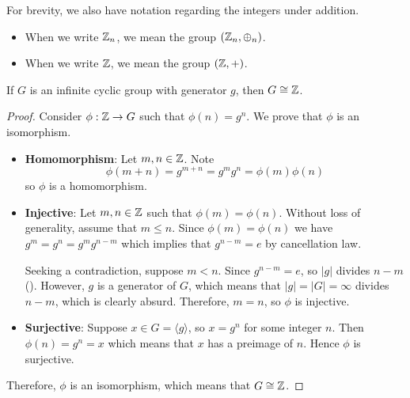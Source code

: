For brevity, we also have notation regarding the integers under addition.
\begin{itemize}
    \item When we write $\mathbb{Z}_n$, we mean the group $(\mathbb{Z}_n, \oplus_n)$.
    \item When we write $\mathbb{Z}$, we mean the group $(\mathbb{Z}, +)$.
\end{itemize}

\begin{theorem}
    If $G$ is an infinite cyclic group with generator $g$, then $G \cong \mathbb{Z}$.
\end{theorem}
\begin{proof}
    Consider $\phi: \mathbb{Z} \to G$ such that $\phi(n) = g^n$. We prove that $\phi$ is an isomorphism.
    \begin{itemize}
        \item \textbf{Homomorphism}: Let $m, n \in \mathbb{Z}$. Note
        \[
            \phi(m+n) = g^{m+n} = g^mg^n = \phi(m)\phi(n)
        \]
        so $\phi$ is a homomorphism.

        \item \textbf{Injective}: Let $m, n \in \mathbb{Z}$ such that $\phi(m) = \phi(n)$. Without loss of generality, assume that $m \leq n$. Since $\phi(m) = \phi(n)$ we have $g^m = g^n = g^mg^{n-m}$ which implies that $g^{n-m} = e$ by cancellation law.

        Seeking a contradiction, suppose $m < n$. Since $g^{n-m} = e$, so $|g|$ divides $n-m$ (). However, $g$ is a generator of $G$, which means that $|g| = |G| = \infty$ divides $n-m$, which is clearly absurd. Therefore, $m = n$, so $\phi$ is injective.

        \item \textbf{Surjective}: Suppose $x \in G = \langle g\rangle$, so $x = g^n$ for some integer $n$. Then $\phi(n) = g^n = x$ which means that $x$ has a preimage of $n$. Hence $\phi$ is surjective.
    \end{itemize}

    Therefore, $\phi$ is an isomorphism, which means that $G \cong \mathbb{Z}$.
\end{proof}

